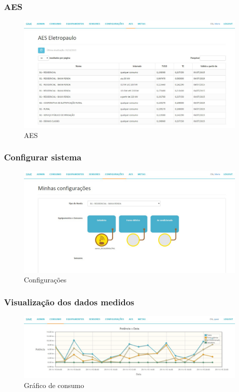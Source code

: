 \subsubsection{AES}
\begin{figure}[H]
\centering
\includegraphics[width=1\textwidth]{figuras/aes.jpg}
\caption{\label{fig:telas-aes} AES}
\end{figure}

\subsubsection{Configurar sistema}
\begin{figure}[H]
\centering
\includegraphics[width=1\textwidth]{figuras/configuracoes.jpg}
\caption{\label{fig:telas-config} Configurações}
\end{figure}


\subsubsection{Visualização dos dados medidos}
\begin{figure}[H]
\centering
\includegraphics[width=1\textwidth]{figuras/consumo.jpg}
\caption{\label{fig:telas-grafico} Gráfico de consumo}
\end{figure}